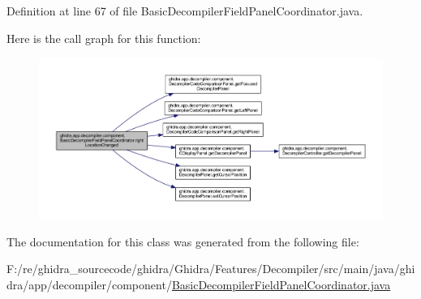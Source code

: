 Definition at line 67 of file Basic\+Decompiler\+Field\+Panel\+Coordinator.\+java.

Here is the call graph for this function\+:
\nopagebreak
\begin{figure}[H]
\begin{center}
\leavevmode
\includegraphics[width=350pt]{classghidra_1_1app_1_1decompiler_1_1component_1_1_basic_decompiler_field_panel_coordinator_a6db30490ab0fa6ececbfa6e079677b9c_cgraph}
\end{center}
\end{figure}


The documentation for this class was generated from the following file\+:\begin{DoxyCompactItemize}
\item 
F\+:/re/ghidra\+\_\+sourcecode/ghidra/\+Ghidra/\+Features/\+Decompiler/src/main/java/ghidra/app/decompiler/component/\mbox{\hyperlink{_basic_decompiler_field_panel_coordinator_8java}{Basic\+Decompiler\+Field\+Panel\+Coordinator.\+java}}\end{DoxyCompactItemize}
